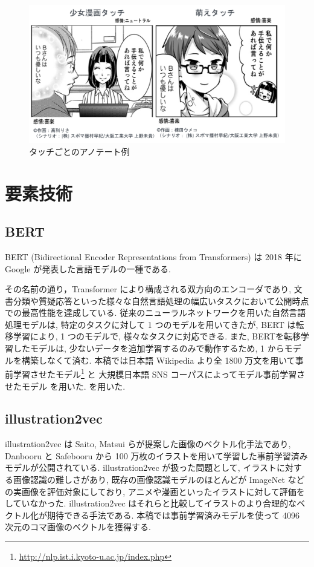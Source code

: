 \documentclass[twocolumn]{jarticle}     %
\begin{document}
\begin{figure}[t]
  \centering
  \includegraphics[width=\linewidth]{4koma.png}
  \caption{タッチごとのアノテート例}
  \label{fig:4koma}
\end{figure}

\section{要素技術}
\subsection{BERT}
BERT (Bidirectional Encoder Representations from Transformers)\cite{BERT} は 2018 年に Google が発表した言語モデルの一種である.

その名前の通り，Transformer により構成される双方向のエンコーダであり, 文書分類や質疑応答といった様々な自然言語処理の幅広いタスクにおいて公開時点での最高性能を達成している.
従来のニューラルネットワークを用いた自然言語処理モデルは, 特定のタスクに対して 1 つのモデルを用いてきたが, BERT は転移学習により, 1 つのモデルで, 様々なタスクに対応できる. また, BERTを転移学習したモデルは, 少ないデータを追加学習するのみで動作するため, 1 からモデルを構築しなくて済む. 本稿では日本語 Wikipedia より全 1800 万文を用いて事前学習させたモデル\footnote{\url{http://nlp.ist.i.kyoto-u.ac.jp/index.php}} と
大規模日本語 SNS コーパスによってモデル事前学習させたモデル \cite{hottoSNS-bert} を用いた.
を用いた.
\newpage

\subsection{illustration2vec}
illustration2vec \cite{i2v} は Saito, Matsui らが提案した画像のベクトル化手法であり, Danbooru と Safebooru から 100 万枚のイラストを用いて学習した事前学習済みモデルが公開されている. illustration2vec が扱った問題として, イラストに対する画像認識の難しさがあり, 既存の画像認識モデルのほとんどが ImageNet などの実画像を評価対象にしており, アニメや漫画といったイラストに対して評価をしていなかった. illustration2vec はそれらと比較してイラストのより合理的なベクトル化が期待できる手法である. 本稿では事前学習済みモデルを使って 4096 次元のコマ画像のベクトルを獲得する.
\end{document}
